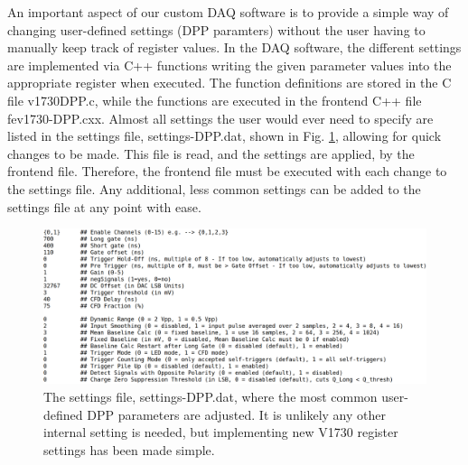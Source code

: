 
An important aspect of our custom DAQ software is to provide a simple way of changing user-defined settings (DPP paramters) without the user having to manually keep track of register values. In the DAQ software, the different settings are implemented via C++ functions writing the given parameter values into the appropriate register when executed. The function definitions are stored in the C file v1730DPP.c, while the functions are executed in the frontend C++ file fev1730-DPP.cxx. Almost all settings the user would ever need to specify are listed in the settings file, settings-DPP.dat, shown in Fig. \ref{fig:settings_file}, allowing for quick changes to be made. This file is read, and the settings are applied, by the frontend file. Therefore, the frontend file must be executed with each change to the settings file. Any additional, less common settings can be added to the settings file at any point with ease.

\begin{figure}[t]
\centering
\includegraphics[width=6.5in]{Chapter-5/figs/settings_file4.png}
\caption{\label{fig:settings_file}The settings file, settings-DPP.dat, where the most common user-defined DPP parameters are adjusted. It is unlikely any other internal setting is needed, but implementing new V1730 register settings has been made simple.}
\end{figure}



